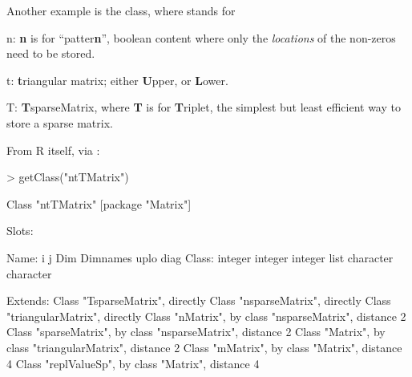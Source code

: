\documentclass{article}
\begin{document}
Another example is the  class, where  stands for
\begin{description}
\item{n: } \textbf{n} is for ``patter\textbf{n}'', boolean content where
  only the \emph{locations} of the non-zeros need to be stored.
\item{t: } \textbf{t}riangular matrix; either \textbf{U}pper, or \textbf{L}ower.
\item{T: } \textbf{T}sparseMatrix, where \textbf{T} is for \textbf{T}riplet,
  the simplest but least efficient way to store a sparse matrix.
\end{description}
From R itself, via :
\begin{Schunk}
\begin{Sinput}
> getClass("ntTMatrix")
\end{Sinput}
\begin{Soutput}
Class "ntTMatrix" [package "Matrix"]

Slots:
                                                                  
Name:          i         j       Dim  Dimnames      uplo      diag
Class:   integer   integer   integer      list character character

Extends: 
Class "TsparseMatrix", directly
Class "nsparseMatrix", directly
Class "triangularMatrix", directly
Class "nMatrix", by class "nsparseMatrix", distance 2
Class "sparseMatrix", by class "nsparseMatrix", distance 2
Class "Matrix", by class "triangularMatrix", distance 2
Class "mMatrix", by class "Matrix", distance 4
Class "replValueSp", by class "Matrix", distance 4
\end{Soutput}
\end{Schunk}
\end{document}
